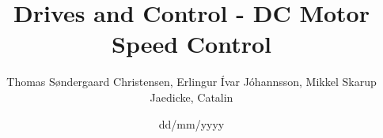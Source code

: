 \documentclass[a4paper,10pt]{article}
\title{Drives and Control - DC Motor Speed Control}
\author{Thomas Søndergaard Christensen, Erlingur Ívar Jóhannsson, Mikkel Skarup Jaedicke, Catalin}
\date{dd/mm/yyyy}
\begin{document}



\newpage
\tableofcontents
\newpage
\listoffigures
\listoftables
\listoftodos
\clearpage
\newpage

\newpage

\newpage

\end{document}
